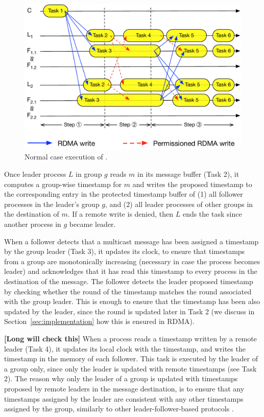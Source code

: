\begin{figure}[ht!]
  \centering
  \includegraphics[width=1\linewidth]{figures/execution}
  \caption{Normal case execution of \libname.}
  \label{fig:normal_operation_time}
\end{figure}

Once leader process $L$ in group $g$ reads $m$ in its message buffer (Task 2), it computes a
group-wise timestamp for $m$ and writes the proposed timestamp to the corresponding entry
in the protected timestamp buffer of (1) all follower processes in the leader's group $g$, and (2) all leader processes 
of other groups in the destination of $m$.
If a remote write is denied, then $L$ ends the task since another process in $g$ became leader.

When a follower detects that a multicast message has been assigned a timestamp by the group leader (Task 3), it updates its clock, to ensure that timestamps from a group are monotonically increasing (necessary in case the process becomes leader) and acknowledges that it has read this timestamp to every process in the destination of the message.
The follower detects the leader proposed timestamp by checking whether the round of the timestamp matches the round associated with the group leader. 
This is enough to ensure that the timestamp has been also updated by the leader, since the round is updated later in Task 2 (we discuss in Section~\ref{sec:implementation} how this is ensured in RDMA).

\textbf{[Long will check this]} When a process reads a timestamp written by a remote leader (Task 4), it updates its local clock with the timestamp, and writes the timestamp in the memory of each follower.
This task is executed by the leader of a group only, since only the leader is updated with remote timestamps (see Task 2).
The reason why only the leader of a group is updated with timestamps proposed by remote leaders in the message destination, is to ensure that any timestamps assigned by the leader are consistent with any other timestamps assigned by the group, similarly to other leader-follower-based protocols \cite{WB, Zab}.

